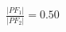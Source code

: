 \documentclass[preview]{standalone}
\begin{document}
\begin{align*}
\frac{|PF_1|}{|PF_2|} = 0.50
\end{align*}
\end{document}
